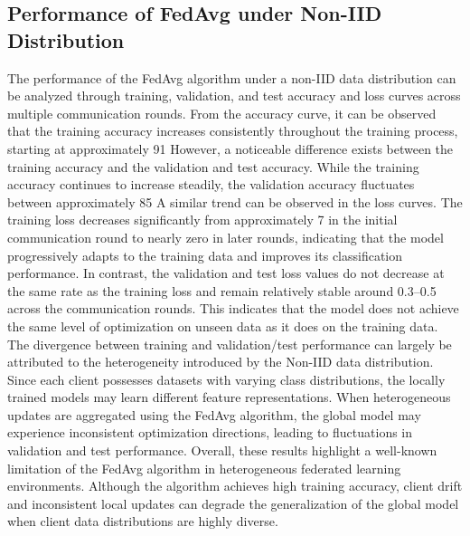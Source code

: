 \documentclass[12pt]{book}
\begin{document}
\subsection{ Performance of FedAvg under Non-IID Distribution}
The performance of the FedAvg algorithm under a non-IID data distribution can be analyzed through training, validation, and test accuracy and loss curves across multiple communication rounds. From the accuracy curve, it can be observed that the training accuracy increases consistently throughout the training process, starting at approximately 91%
However, a noticeable difference exists between the training accuracy and the validation and test accuracy. While the training accuracy continues to increase steadily, the validation accuracy fluctuates between approximately 85%
A similar trend can be observed in the loss curves. The training loss decreases significantly from approximately 7 in the initial communication round to nearly zero in later rounds, indicating that the model progressively adapts to the training data and improves its classification performance. In contrast, the validation and test loss values do not decrease at the same rate as the training loss and remain relatively stable around 0.3–0.5 across the communication rounds. This indicates that the model does not achieve the same level of optimization on unseen data as it does on the training data.
The divergence between training and validation/test performance can largely be attributed to the heterogeneity introduced by the Non-IID data distribution. Since each client possesses datasets with varying class distributions, the locally trained models may learn different feature representations. When heterogeneous updates are aggregated using the FedAvg algorithm, the global model may experience inconsistent optimization directions, leading to fluctuations in validation and test performance.
Overall, these results highlight a well-known limitation of the FedAvg algorithm in heterogeneous federated learning environments. Although the algorithm achieves high training accuracy, client drift and inconsistent local updates can degrade the generalization of the global model when client data distributions are highly diverse.
\end{document}
